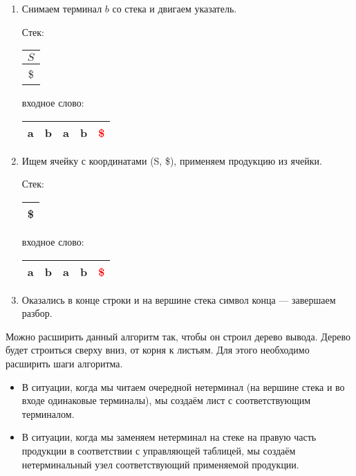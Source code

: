 \begin{example}
\begin{enumerate}
\item Снимаем терминал $b$ со стека и двигаем указатель.

    Стек: \,
    \begin{tabular}[c]{ |c| }
        \\ \hline
        $S$ \\ \hline
        \$ \\ \hline
    \end{tabular}
    \qquad  \qquad \qquad  \qquad входное слово: \,
    \begin{tabular}[c]{ |c|c|c|c|c| }
        \hline
        a & b & a & b & \textcolor{red}{\$} \\ \hline
    \end{tabular}

\item Ищем ячейку с координатами (S, \$), применяем продукцию из ячейки.

    Стек: \,
    \begin{tabular}[c]{ |c| }
        \\ \hline
        \$ \\ \hline
    \end{tabular}
    \qquad  \qquad \qquad  \qquad входное слово: \,
    \begin{tabular}[c]{ |c|c|c|c|c| }
        \hline
        a & b & a & b & \textcolor{red}{\$} \\ \hline
    \end{tabular}

\item Оказались в конце строки и на вершине стека символ конца --- завершаем разбор.

\end{enumerate}

\end{example}

Можно расширить данный алгоритм так, чтобы он строил дерево вывода. Дерево будет строиться сверху вниз, от корня к листьям. Для этого необходимо расширить шаги алгоритма.
\begin{itemize}
  \item В ситуации, когда мы читаем очередной нетерминал (на вершине стека и во входе одинаковые терминалы), мы создаём лист с соответствующим терминалом.
  \item В ситуации, когда мы заменяем нетерминал на стеке на правую часть продукции в соответствии с управляющей таблицей, мы создаём нетерминальный узел соответствующий применяемой продукции.
\end{itemize}

